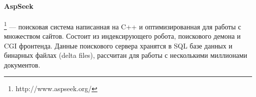 \paragraph{AspSeek}\footnote{http://www.aspseek.org/} --- поисковая система написанная на C++ и оптимизированная для работы с множеством сайтов. Состоит из индексирующего робота, поискового демона и CGI фронтенда. Данные поискового сервера хранятся в SQL базе данных и бинарных файлах (delta files), рассчитан для работы с несколькими миллионами документов.


